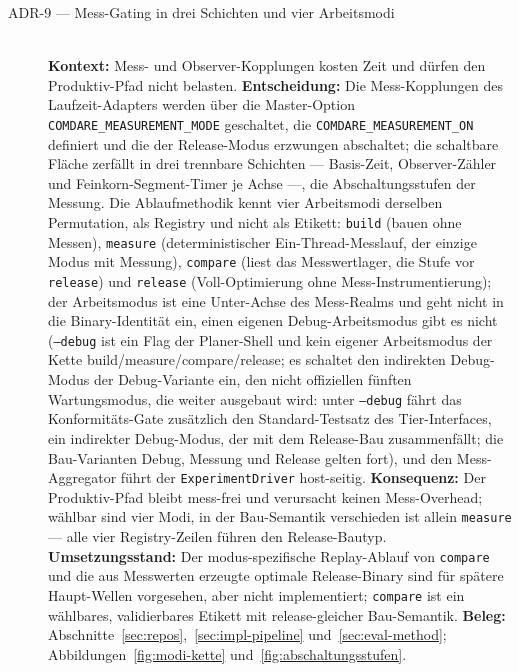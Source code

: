 \begin{description}
  \item[ADR-9 --- Mess-Gating in drei Schichten und vier Arbeitsmodi]\hfill\\
  \textbf{Kontext:} Mess- und Observer-Kopplungen kosten Zeit und dürfen den Produktiv-Pfad
  nicht belasten.
  \textbf{Entscheidung:} Die Mess-Kopplungen des Laufzeit-Adapters werden über die Master-Option
  \texttt{COMDARE\_MEASUREMENT\_MODE} geschaltet, die \texttt{COMDARE\_MEASUREMENT\_ON} definiert und die
  der Release-Modus erzwungen abschaltet; die schaltbare Fläche zerfällt in drei trennbare Schichten
  --- Basis-Zeit, Observer-Zähler und Feinkorn-Segment-Timer je Achse ---, die Abschaltungsstufen der
  Messung. Die Ablaufmethodik kennt vier Arbeitsmodi derselben Permutation, als Registry und nicht als
  Etikett: \texttt{build} (bauen ohne Messen), \texttt{measure} (deterministischer
  Ein-Thread-Messlauf, der einzige Modus mit Messung), \texttt{compare} (liest das Messwertlager, die
  Stufe vor \texttt{release}) und \texttt{release} (Voll-Optimierung ohne Mess-Instrumentierung); der
  Arbeitsmodus ist eine Unter-Achse des Mess-Realms und geht nicht in die Binary-Identität ein, einen eigenen Debug-Arbeitsmodus gibt es nicht (\texttt{--debug} ist ein Flag der Planer-Shell und kein eigener
  Arbeitsmodus der Kette build/measure/compare/release; es schaltet den indirekten Debug-Modus der Debug-Variante
  ein, den nicht offiziellen fünften Wartungsmodus, die weiter ausgebaut wird: unter \texttt{--debug} fährt das
  Konformitäts-Gate zusätzlich den Standard-Testsatz des Tier-Interfaces, ein indirekter Debug-Modus, der mit dem
  Release-Bau zusammenfällt; die Bau-Varianten Debug, Messung und Release gelten fort), und den Mess-Aggregator führt der \texttt{ExperimentDriver} host-seitig.
  \textbf{Konsequenz:} Der Produktiv-Pfad bleibt mess-frei und verursacht keinen Mess-Overhead; wählbar sind
  vier Modi, in der Bau-Semantik verschieden ist allein \texttt{measure} --- alle vier Registry-Zeilen
  führen den Release-Bautyp.
  \textbf{Umsetzungsstand:} Der modus-spezifische Replay-Ablauf von \texttt{compare} und die aus
  Messwerten erzeugte optimale Release-Binary sind für spätere Haupt-Wellen vorgesehen, aber nicht
  implementiert;
  \texttt{compare} ist ein wählbares, validierbares Etikett mit release-gleicher
  Bau-Semantik.
  \textbf{Beleg:} Abschnitte~\ref{sec:repos},~\ref{sec:impl-pipeline} und~\ref{sec:eval-method};
  Abbildungen~\ref{fig:modi-kette} und~\ref{fig:abschaltungsstufen}.


\end{description}
